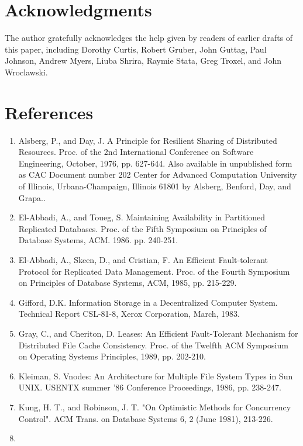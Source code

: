 \documentclass[a4paper,11pt,notitlepage,twoside,openright]{article}
\begin{document}
\section*{Acknowledgments}

The author gratefully acknowledges the help given by readers of earlier
drafts of this paper, including Dorothy Curtis, Robert Gruber, John
Guttag, Paul Johnson, Andrew Myers, Liuba Shrira, Raymie Stata, Greg
Troxel, and John Wroclawski.

\hypertarget{references}{%
\section{References}\label{references}}

\begin{enumerate}
\def\labelenumi{\arabic{enumi}.}
\item
  Alsberg, P., and Day, J. A Principle for Resilient Sharing of
  Distributed Resources. Proc. of the 2nd International Conference on
  Software Engineering, October, 1976, pp. 627-644. Also available in
  unpublished form as CAC Document number 202 Center for Advanced
  Computation University of Illinois, Urbana-Champaign, Illinois 61801
  by Alsberg, Benford, Day, and Grapa..
\item
  El-Abbadi, A., and Toueg, S. Maintaining Availability in Partitioned
  Replicated Databases. Proc. of the Fifth Symposium on Principles of
  Database Systems, ACM. 1986. pp. 240-251.
\item
  El-Abbadi, A., Skeen, D., and Cristian, F. An Efficient Fault-tolerant
  Protocol for Replicated Data Management. Proc. of the Fourth Symposium
  on Principles of Database Systems, ACM, 1985, pp. 215-229.
\item
  Gifford, D.K. Information Storage in a Decentralized Computer System.
  Technical Report CSL-81-8, Xerox Corporation, March, 1983.
\item
  Gray, C., and Cheriton, D. Leases: An Efficient Fault-Tolerant
  Mechanism for Distributed File Cache Consistency. Proc. of the Twelfth
  ACM Symposium on Operating Systems Principles, 1989, pp. 202-210.
\item
  Kleiman, S. Vnodes: An Architecture for Multiple File System Types in
  Sun UNIX. USENTX summer '86 Conference Proceedings, 1986, pp. 238-247.
\item
  Kung, H. T., and Robinson, J. T. "On Optimistic Methods for
  Concurrency Control". ACM Trans. on Database Systems 6, 2 (June 1981),
  213-226.
\item

\end{enumerate}
\end{document}

